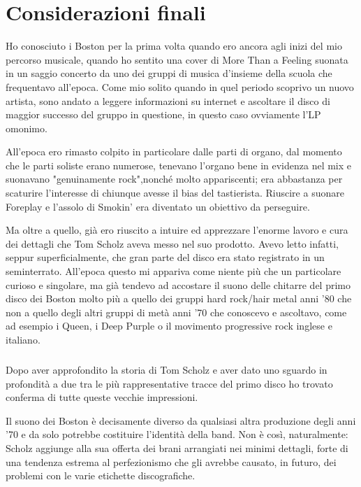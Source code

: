 \documentclass[class=book, crop=false, oneside, 12pt]{standalone}
\begin{document}
\chapter*{Considerazioni finali}
Ho conosciuto i Boston per la prima volta quando ero ancora agli inizi del mio percorso musicale, quando ho sentito una cover di More Than a Feeling suonata in un saggio concerto da uno dei gruppi di musica d'insieme della scuola che frequentavo all'epoca. Come mio solito quando in quel periodo scoprivo un nuovo artista, sono andato a leggere informazioni su internet e ascoltare il disco di maggior successo del gruppo in questione, in questo caso ovviamente l'LP omonimo. 

All'epoca ero rimasto colpito in particolare dalle parti di organo, dal momento che le parti soliste erano numerose, tenevano l'organo bene in evidenza nel mix e suonavano "genuinamente rock",nonché molto appariscenti; era abbastanza per scaturire l'interesse di chiunque avesse il bias del tastierista. Riuscire a suonare Foreplay e l'assolo di Smokin' era diventato un obiettivo da perseguire.

Ma oltre a quello, già ero riuscito a intuire ed apprezzare l'enorme lavoro e cura dei dettagli che Tom Scholz aveva messo nel suo prodotto. Avevo letto infatti, seppur superficialmente, che gran parte del disco era stato  registrato in un seminterrato. All'epoca questo mi appariva come niente più che un particolare curioso e singolare, ma già tendevo ad accostare il suono delle chitarre del primo disco dei Boston molto più a quello dei gruppi hard rock/hair metal anni '80 che non a quello degli altri gruppi di metà anni '70 che conoscevo e ascoltavo, come ad esempio i Queen, i Deep Purple o il movimento progressive rock inglese e italiano.

\paragraph{}
Dopo aver approfondito la storia di Tom Scholz e aver dato uno sguardo in profondità a due tra le più rappresentative tracce del primo disco ho trovato conferma di tutte queste vecchie impressioni. 

Il suono dei Boston è decisamente diverso da qualsiasi altra produzione degli anni '70 e da solo potrebbe costituire l'identità della  band. Non è così, naturalmente: Scholz aggiunge alla sua offerta dei brani arrangiati nei minimi dettagli, forte di una tendenza estrema al perfezionismo che gli avrebbe causato, in futuro, dei problemi con le varie etichette discografiche.
\end{document}
